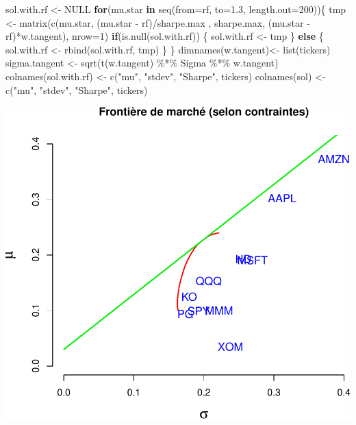 \documentclass[
]{article}
\newenvironment{Shaded}{\begin{snugshade}}{\end{snugshade}}
\newcommand{\AttributeTok}[1]{\textcolor[rgb]{0.77,0.63,0.00}{#1}}
\newcommand{\ConstantTok}[1]{\textcolor[rgb]{0.00,0.00,0.00}{#1}}
\newcommand{\ControlFlowTok}[1]{\textcolor[rgb]{0.13,0.29,0.53}{\textbf{#1}}}
\newcommand{\DecValTok}[1]{\textcolor[rgb]{0.00,0.00,0.81}{#1}}
\newcommand{\FloatTok}[1]{\textcolor[rgb]{0.00,0.00,0.81}{#1}}
\newcommand{\FunctionTok}[1]{\textcolor[rgb]{0.00,0.00,0.00}{#1}}
\newcommand{\NormalTok}[1]{#1}
\newcommand{\OtherTok}[1]{\textcolor[rgb]{0.56,0.35,0.01}{#1}}
\newcommand{\SpecialCharTok}[1]{\textcolor[rgb]{0.00,0.00,0.00}{#1}}
\newcommand{\StringTok}[1]{\textcolor[rgb]{0.31,0.60,0.02}{#1}}
\begin{document}
\begin{Shaded}
\begin{Highlighting}[]
\NormalTok{sol.with.rf }\OtherTok{\textless{}{-}} \ConstantTok{NULL}
\ControlFlowTok{for}\NormalTok{(mu.star }\ControlFlowTok{in} \FunctionTok{seq}\NormalTok{(}\AttributeTok{from=}\NormalTok{rf, }\AttributeTok{to=}\FloatTok{1.3}\NormalTok{, }\AttributeTok{length.out=}\DecValTok{200}\NormalTok{))\{}
\NormalTok{  tmp }\OtherTok{\textless{}{-}} \FunctionTok{matrix}\NormalTok{(}\FunctionTok{c}\NormalTok{(mu.star, (mu.star }\SpecialCharTok{{-}}\NormalTok{ rf)}\SpecialCharTok{/}\NormalTok{sharpe.max , sharpe.max, (mu.star }\SpecialCharTok{{-}}\NormalTok{ rf)}\SpecialCharTok{*}\NormalTok{w.tangent), }\AttributeTok{nrow=}\DecValTok{1}\NormalTok{)}
  \ControlFlowTok{if}\NormalTok{(}\FunctionTok{is.null}\NormalTok{(sol.with.rf)) \{}
\NormalTok{    sol.with.rf }\OtherTok{\textless{}{-}}\NormalTok{ tmp  }
\NormalTok{  \} }\ControlFlowTok{else}\NormalTok{ \{}
\NormalTok{    sol.with.rf }\OtherTok{\textless{}{-}} \FunctionTok{rbind}\NormalTok{(sol.with.rf, tmp)}
\NormalTok{  \}}
\NormalTok{\}}
\FunctionTok{dimnames}\NormalTok{(w.tangent)}\OtherTok{\textless{}{-}} \FunctionTok{list}\NormalTok{(tickers)}
\NormalTok{sigma.tangent }\OtherTok{\textless{}{-}} \FunctionTok{sqrt}\NormalTok{(}\FunctionTok{t}\NormalTok{(w.tangent) }\SpecialCharTok{\%*\%}\NormalTok{ Sigma }\SpecialCharTok{\%*\%}\NormalTok{ w.tangent)}
\FunctionTok{colnames}\NormalTok{(sol.with.rf) }\OtherTok{\textless{}{-}} \FunctionTok{c}\NormalTok{(}\StringTok{"mu"}\NormalTok{, }\StringTok{"stdev"}\NormalTok{, }\StringTok{"Sharpe"}\NormalTok{, tickers)}
\FunctionTok{colnames}\NormalTok{(sol) }\OtherTok{\textless{}{-}} \FunctionTok{c}\NormalTok{(}\StringTok{"mu"}\NormalTok{, }\StringTok{"stdev"}\NormalTok{, }\StringTok{"Sharpe"}\NormalTok{, tickers)}
\end{Highlighting}
\end{Shaded}

\includegraphics{TP-2_files/figure-latex/unnamed-chunk-14-1.pdf}
\end{document}

